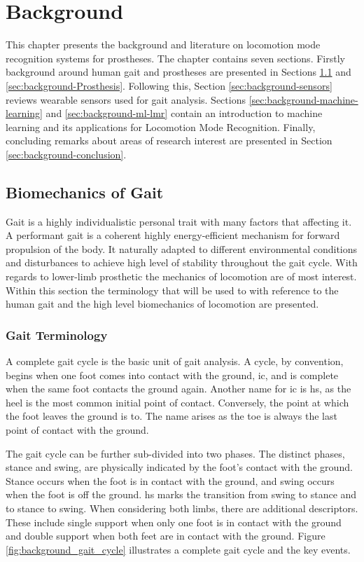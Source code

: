 \chapter{Background}
\label{chp:background}
This chapter presents the background and literature on locomotion mode recognition systems for prostheses. The chapter contains seven sections. Firstly background around human gait and prostheses are presented in Sections \ref{sec:background-gait} and \ref{sec:background-Prosthesis}. Following this, Section \ref{sec:background-sensors} reviews wearable sensors used for gait analysis. Sections \ref{sec:background-machine-learning} and \ref{sec:background-ml-lmr} contain an introduction to machine learning and its applications for Locomotion Mode Recognition. Finally, concluding remarks about areas of research interest are presented in Section \ref{sec:background-conclusion}.

\section{Biomechanics of Gait}
\label{sec:background-gait}
Gait is a highly individualistic personal trait with many factors that affecting it\cite{Horst2019}. A performant gait is a coherent highly energy-efficient mechanism for forward propulsion of the body. It naturally adapted to different environmental conditions and disturbances to achieve high level of stability throughout the gait cycle\cite{Shah2020, Mummolo2013}. With regards to lower-limb prosthetic the mechanics of locomotion are of most interest. Within this section the terminology that will be used to with reference to the human gait and the high level biomechanics of locomotion are presented.

\subsection{Gait Terminology}
A complete gait cycle is the basic unit of gait analysis. A cycle, by convention, begins when one foot comes into contact with the ground, \acrfull{ic}, and is complete when the same foot contacts the ground again. Another name for \acrshort{ic} is \acrfull{hs}, as the heel is the most common initial point of contact. Conversely, the point at which the foot leaves the ground is \acrfull{to}. The name arises as the toe is always the last point of contact with the ground.\cite{Novacheck1998, Shah2020}

The gait cycle can be further sub-divided into two phases. The distinct phases, stance and swing, are physically indicated by the foot's contact with the ground. Stance occurs when the foot is in contact with the ground, and swing occurs when the foot is off the ground. \acrshort{hs} marks the transition from swing to stance and \acrshort{to} stance to swing. When considering both limbs, there are additional descriptors. These include single support when only one foot is in contact with the ground and double support when both feet are in contact with the ground. Figure \ref{fig:background_gait_cycle} illustrates a complete gait cycle and the key events.\cite{Novacheck1998, Shah2020}

